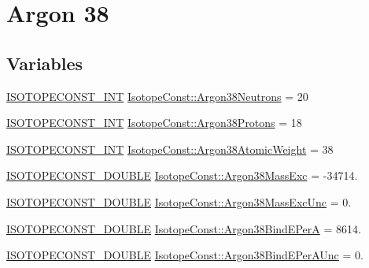 \hypertarget{group___isotope_const-_argon-_ar38}{}\section{Argon 38}
\label{group___isotope_const-_argon-_ar38}
\subsection*{Variables}
\begin{DoxyCompactItemize}
\item 
\mbox{\hyperlink{group___isotope_const-_macros_ga5f18360b3e99483a35c32d789e62621c}{I\+S\+O\+T\+O\+P\+E\+C\+O\+N\+S\+T\+\_\+\+I\+NT}} \mbox{\hyperlink{group___isotope_const-_argon-_ar38_gaef1085453b45d2e58ff5382fae62e289}{Isotope\+Const\+::\+Argon38\+Neutrons}} = 20
\item 
\mbox{\hyperlink{group___isotope_const-_macros_ga5f18360b3e99483a35c32d789e62621c}{I\+S\+O\+T\+O\+P\+E\+C\+O\+N\+S\+T\+\_\+\+I\+NT}} \mbox{\hyperlink{group___isotope_const-_argon-_ar38_ga535e1cf0f29b27cb49e29aea80081266}{Isotope\+Const\+::\+Argon38\+Protons}} = 18
\item 
\mbox{\hyperlink{group___isotope_const-_macros_ga5f18360b3e99483a35c32d789e62621c}{I\+S\+O\+T\+O\+P\+E\+C\+O\+N\+S\+T\+\_\+\+I\+NT}} \mbox{\hyperlink{group___isotope_const-_argon-_ar38_ga6017c7e353e69a2620127556a1354f41}{Isotope\+Const\+::\+Argon38\+Atomic\+Weight}} = 38
\item 
\mbox{\hyperlink{group___isotope_const-_macros_ga8f45a7272ce02c0b4c65c44636ed719a}{I\+S\+O\+T\+O\+P\+E\+C\+O\+N\+S\+T\+\_\+\+D\+O\+U\+B\+LE}} \mbox{\hyperlink{group___isotope_const-_argon-_ar38_ga400620d221650b81362aa94c9021f450}{Isotope\+Const\+::\+Argon38\+Mass\+Exc}} = -\/34714.
\item 
\mbox{\hyperlink{group___isotope_const-_macros_ga8f45a7272ce02c0b4c65c44636ed719a}{I\+S\+O\+T\+O\+P\+E\+C\+O\+N\+S\+T\+\_\+\+D\+O\+U\+B\+LE}} \mbox{\hyperlink{group___isotope_const-_argon-_ar38_ga613176101e3bf8ebfc5115c3da620ac8}{Isotope\+Const\+::\+Argon38\+Mass\+Exc\+Unc}} = 0.
\item 
\mbox{\hyperlink{group___isotope_const-_macros_ga8f45a7272ce02c0b4c65c44636ed719a}{I\+S\+O\+T\+O\+P\+E\+C\+O\+N\+S\+T\+\_\+\+D\+O\+U\+B\+LE}} \mbox{\hyperlink{group___isotope_const-_argon-_ar38_ga11cfd605a76cdc6a03cb419006153428}{Isotope\+Const\+::\+Argon38\+Bind\+E\+PerA}} = 8614.
\item 
\mbox{\hyperlink{group___isotope_const-_macros_ga8f45a7272ce02c0b4c65c44636ed719a}{I\+S\+O\+T\+O\+P\+E\+C\+O\+N\+S\+T\+\_\+\+D\+O\+U\+B\+LE}} \mbox{\hyperlink{group___isotope_const-_argon-_ar38_ga10000713ebc5ebce5522784a2856d114}{Isotope\+Const\+::\+Argon38\+Bind\+E\+Per\+A\+Unc}} = 0.

\end{DoxyCompactItemize}

